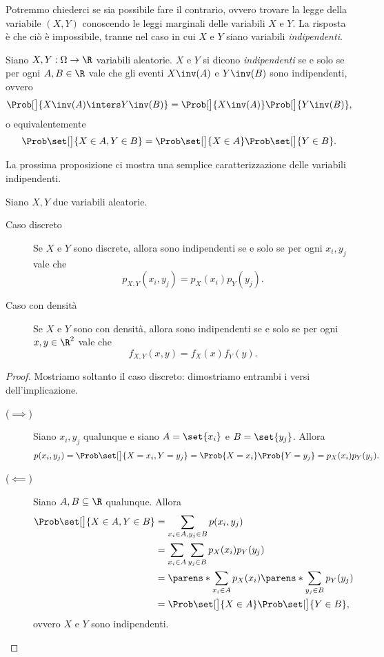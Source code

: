 Potremmo chiederci se sia possibile fare il contrario, ovvero trovare la legge della variabile $(X, Y)$ conoscendo le leggi marginali delle variabili $X$ e $Y$. La risposta è che ciò è impossibile, tranne nel caso in cui $X$ e $Y$ siano variabili \emph{indipendenti}.

\begin{definition}
    Siano $X, Y : \Omega \to \R$ variabili aleatorie. $X$ e $Y$ si dicono \emph{indipendenti} se e solo se per ogni $A, B \in \R$ vale che gli eventi $X\inv(A)$ e $Y\inv(B)$ sono indipendenti, ovvero \[
        \Prob[\big]{X\inv(A) \inters Y\inv(B)} = \Prob[\big]{X\inv(A)}\Prob[\big]{Y\inv(B)},    
    \] o equivalentemente \[
        \Prob\set[\big]{X \in A, Y \in B} = \Prob\set[\big]{X \in A}\Prob\set[\big]{Y \in B}.     
    \]
\end{definition}

La prossima proposizione ci mostra una semplice caratterizzazione delle variabili indipendenti.
\begin{proposition}
    Siano $X, Y$ due variabili aleatorie. \begin{description}
        \item[Caso discreto] Se $X$ e $Y$ sono discrete, allora sono indipendenti se e solo se per ogni $x_i, y_j$ vale che \[
            p_{X, Y}(x_i, y_j) = p_X(x_i)p_Y(y_j).
        \]
        \item[Caso con densità] Se $X$ e $Y$ sono con densità, allora sono indipendenti se e solo se per ogni $x, y \in \R^2$ vale che \[
            f_{X, Y}(x, y) = f_X(x)f_Y(y).
        \]
    \end{description}
\end{proposition}
\begin{proof}
    Mostriamo soltanto il caso discreto: dimostriamo entrambi i versi dell'implicazione.
    \begin{description}
        \item[($\implies$)] Siano $x_i, y_j$ qualunque e siano $A = \set{x_i}$ e $B = \set{y_j}$. Allora \begin{align*}
            p(x_i, y_j) = \Prob\set[\big]{X = x_i, Y = y_j} = \Prob{X = x_i}\Prob{Y = y_j} = p_X(x_i)p_Y(y_j).
        \end{align*}
        \item[($\impliedby$)] Siano $A, B \subseteq \R$ qualunque. Allora \begin{align*}
            \Prob\set[\big]{X \in A, Y \in B} &= \sum_{x_i \in A, y_j \in B} p(x_i, y_j)\\
            &= \sum_{x_i \in A}\sum_{y_j \in B} p_X(x_i)p_Y(y_j)\\
            &= \parens*{\sum_{x_i \in A} p_X(x_i)} \parens*{\sum_{y_j \in B} p_Y(y_j)}\\
            &= \Prob\set[\big]{X \in A}\Prob\set[\big]{Y \in B},
        \end{align*} ovvero $X$ e $Y$ sono indipendenti. \qedhere
    \end{description}
\end{proof}

